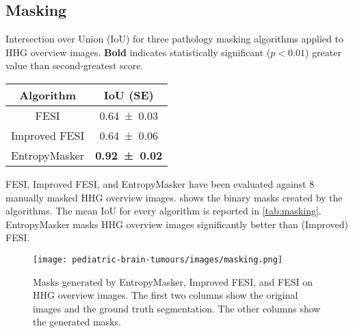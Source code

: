 \subsection{Masking}

\begin{margintable}
    \centering
    \caption[IoU of masks generated by EntropyMasker, Improved FESI, and FESI]{
        Intersection over Union (IoU) for three pathology masking algorithms applied to HHG overview images.
        \textbf{Bold} indicates statistically significant ($p < 0.01$) greater value than second-greatest score.
    }
    \label{tab:masking}
    \begin{tabular}[\linewidth]{cc}
        \toprule
        Algorithm & IoU (SE) \\
        \midrule
        FESI & \num[uncertainty-mode=compact]{0.64 \pm 0.03} \\
        Improved FESI & \num[uncertainty-mode=compact]{0.64 \pm 0.06} \\
        EntropyMasker & \textbf{\num[uncertainty-mode=compact]{0.92 \pm 0.02}} \\
        \bottomrule
    \end{tabular}
\end{margintable}

FESI, Improved FESI, and EntropyMasker have been evaluated against 8 manually masked HHG overview images.
 shows the binary masks created by the algorithms.
The mean IoU for every algorithm is reported in \cref{tab:masking}.
EntropyMasker masks HHG overview images significantly better than (Improved) FESI.

\begin{figure*}
    \centering
    \texttt{[image: pediatric-brain-tumours/images/masking.png]}
    \caption[Masks generated by EntropyMasker, Improved FESI, and FESI]{
        Masks generated by EntropyMasker, Improved FESI, and FESI on HHG overview images.
        The first two columns show the original images and the ground truth segmentation.
        The other columns show the generated masks.
    }
    \label{fig:masking-results}
\end{figure*}